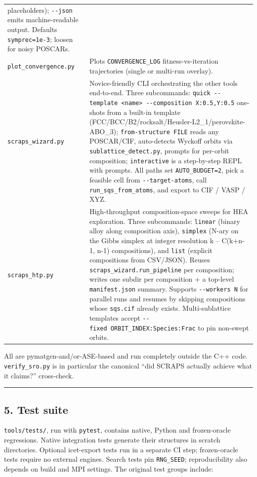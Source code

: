 \documentclass[
  11pt,
]{article}
\begin{document}
\begin{longtable}[]{@{}
  >{\raggedright\arraybackslash}p{}
  >{\raggedright\arraybackslash}p{}@{}}
placeholders); \texttt{-\/-json} emits machine-readable output. Defaults
\texttt{symprec=1e-3}; loosen for noisy POSCARs. \\
\texttt{plot\_convergence.py} & Plots \texttt{CONVERGENCE\_LOG}
fitness-vs-iteration trajectories (single or multi-run overlay). \\
\texttt{scraps\_wizard.py} & Novice-friendly CLI orchestrating the other
tools end-to-end. Three subcommands:
\texttt{quick\ -\/-template\ \textless{}name\textgreater{}\ -\/-composition\ X:0.5,Y:0.5}
one-shots from a built-in template
(FCC/BCC/B2/rocksalt/Heusler-L2\_1/perovskite-ABO\_3);
\texttt{from-structure\ FILE} reads any POSCAR/CIF, auto-detects Wyckoff
orbits via \texttt{sublattice\_detect.py}, prompts for per-orbit
composition; \texttt{interactive} is a step-by-step REPL with prompts.
All paths set \texttt{AUTO\_BUDGET=2}, pick a feasible cell from
\texttt{-\/-target-atoms}, call \texttt{run\_sqs\_from\_atoms}, and
export to CIF / VASP / XYZ. \\
\texttt{scraps\_htp.py} & High-throughput composition-space sweeps for
HEA exploration. Three subcommands: \texttt{linear} (binary alloy along
composition axis), \texttt{simplex} (N-ary on the Gibbs simplex at
integer resolution k -- C(k+n-1, n-1) compositions), and \texttt{list}
(explicit compositions from CSV/JSON). Reuses
\texttt{scraps\_wizard.run\_pipeline} per composition; writes one subdir
per composition + a top-level \texttt{manifest.json} summary. Supports
\texttt{-\/-workers\ N} for parallel runs and resumes by skipping
compositions whose \texttt{sqs.cif} already exists. Multi-sublattice
templates accept \texttt{-\/-fixed\ ORBIT\_INDEX:Species:Frac} to pin
non-swept orbits. \\
\end{longtable}

All are pymatgen-and/or-ASE-based and run completely outside the C++
code. \texttt{verify\_sro.py} is in particular the canonical ``did
SCRAPS actually achieve what it claims?'' cross-check.

\begin{center}\rule{0.5\linewidth}{0.5pt}\end{center}

\subsection{5. Test suite}\label{test-suite}

\texttt{tools/tests/}, run with \texttt{pytest}, contains native, Python
and frozen-oracle regressions. Native integration tests generate their
structures in scratch directories. Optional icet-export tests run in a
separate CI step; frozen-oracle tests require no external engines.
Search tests pin \texttt{RNG\_SEED}; reproducibility also depends on
build and MPI settings. The original test groups include:
\end{document}
